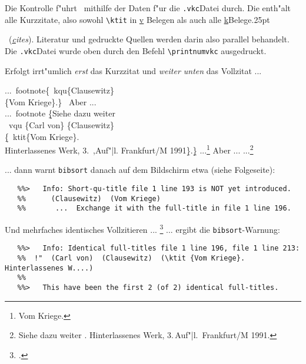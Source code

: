 \documentclass[12pt,a4paper]{article}
\newcommand{\pdfko}[1]{\kern #1pt
                          \strut\ignorespaces}%
\newcommand{\pbs}{\string\ \unskip}
\newcommand{\bs}{\protect\pbs}
\begin{document}
 \vspace{-2ex}\noindent 
 Die Kontrolle f"uhrt \BibArts\ mithilfe der Daten f"ur die \verb|.vkc|\hy Datei durch. 
 Die enth"alt alle Kurzzitate, also sowohl \verb|\ktit| in \underline{v\ko}\hy 
 Belegen als auch alle \underline{k}\hy Belege\pdfko{.25}\ 
 (\textit{\underline{c}ites}). 
 Literatur und gedruckte Quellen werden darin also parallel behandelt. Die 
 \verb|.vkc|\hy Datei wurde oben durch den Befehl \verb|\printnumvkc| ausgedruckt.

 \vspace{1ex}\noindent
 Erfolgt irrt"umlich \textit{erst} das Kurzzitat und
 \textit{weiter unten} das Vollzitat ...

\Doppelbox
{...\bs footnote\{\bs kqu\{Clausewitz\}
 \\ \hspace{2em} \{Vom Kriege\}.\} 
 \ Aber ... \\
 ...\bs footnote \b{\b{\{}}Siehe dazu weiter 
 \\ \hspace{.5em} \bs vqu \{Carl von\}
 \{Clausewitz\} 
 \\ \hspace{2.5em} \b{\{}\bs ktit\{Vom Kriege\}.
 \\ \hspace{3em} Hinterlassenes Werk, 
 3.\bs,Auf\string"|l. Frankfurt/M 1991\b{\}}.\b{\b{\}}}
}
{...\footnote{ {Vom Kriege}.}
 Aber ...
 ...\footnote{Siehe dazu weiter  {.
 Hinterlassenes Werk, 3.\,Auf"|l.\ Frankfurt/M 1991}.}
}

 \noindent
 ... dann warnt \verb|bibsort| danach auf dem
 Bildschirm etwa (siehe Folgeseite):

 \vspace{-.75ex}
  {\scriptsize\begin{verbatim} 
   %%>   Info: Short-qu-title file 1 line 193 is NOT yet introduced.
   %%      (Clausewitz)  (Vom Kriege)  
   %%       ...  Exchange it with the full-title in file 1 line 196.
  \end{verbatim}} %

 \vspace{-2.75ex}\noindent 
 Und mehrfaches identisches Vollzitieren ... \footnote{.} ... ergibt die \verb|bibsort|-Warnung:

  \vspace{-.75ex}
  {\scriptsize\begin{verbatim} 
   %%>   Info: Identical full-titles file 1 line 196, file 1 line 213:
   %%  !"  (Carl von)  (Clausewitz)  (\ktit {Vom Kriege}. Hinterlassenes W....)  
   %%
   %%>   This have been the first 2 (of 2) identical full-titles.
  \end{verbatim}}
\end{document}
